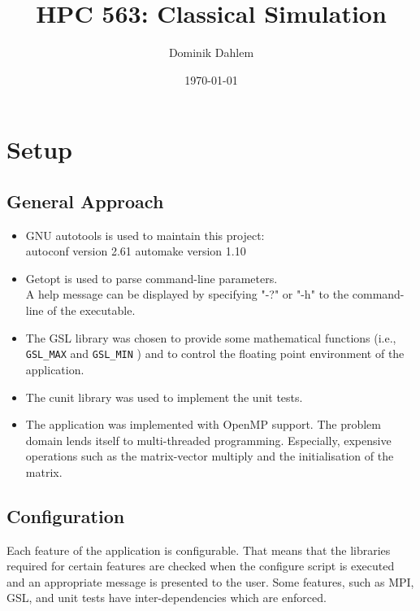 \documentclass[12pt,a4paper]{report}
\author{Dominik Dahlem}
\title{HPC 563: Classical Simulation}
\date{\today}
\def\ccode#1{
  \lstinline[basicstyle=\ttfamily,language=C]{#1} }
\begin{document}
\maketitle

\chapter{Setup}
\label{cha:setup}

\section{General Approach}
\label{sec:general-approach}
\begin{itemize}
\item GNU autotools is used to maintain this project:\\
  autoconf version 2.61 automake version 1.10
\item Getopt is used to parse command-line parameters.\\
  A help message can be displayed by specifying "-?" or "-h" to the
  command-line of the executable.
\item The GSL library was chosen to provide some mathematical
  functions (i.e., \ccode{GSL_MAX} and \ccode{GSL_MIN}) and to control
  the floating point environment of the application.
\item The cunit library was used to implement the unit tests.
\item The application was implemented with OpenMP support. The problem
  domain lends itself to multi-threaded programming. Especially,
  expensive operations such as the matrix-vector multiply and the
  initialisation of the matrix.
\end{itemize}

\section{Configuration}
\label{sec:configuration}
Each feature of the application is configurable. That means that the
libraries required for certain features are checked when the configure
script is executed and an appropriate message is presented to the
user. Some features, such as MPI, GSL, and unit tests have
inter-dependencies which are enforced.
\end{document}
